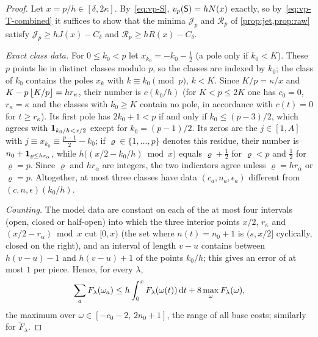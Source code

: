 \begin{proof}
Let $x=p/h\in[\delta,2\kappa]$. By~\eqref{eq:vp-S}, $v_p(\mathsf{S})=hN(x)$ exactly, so
by~\eqref{eq:vp-T-combined} it suffices to show that the minima $\mathcal J_p$ and $\mathcal R_p$
of \cref{prop:jet,prop:raw} satisfy $\mathcal J_p\ge hJ(x)-C_\delta$ and
$\mathcal R_p\ge hR(x)-C_\delta$.

\emph{Exact class data.} For $0\le k_0<p$ let $x_{k_0}=-k_0-\frac12$ (a pole only if $k_0<K$).
These $p$ points lie in distinct classes modulo $p$, so the classes are indexed by $k_0$; the class
of $k_0$ contains the poles $x_k$ with $k\equiv k_0\pmod p$, $k<K$. Since $K/p=\kappa/x$ and
$K-p\left\lfloor K/p\right\rfloor=hr_\kappa$, their number is $c(k_0/h)$ (for $K<p\le2K$ one has $c_0=0$,
$r_\kappa=\kappa$ and the classes with $k_0\ge K$ contain no pole, in accordance with
$c(t)=0$ for $t\ge r_\kappa$). Its first pole has
$2k_0+1<p$ if and only if $k_0\le(p-3)/2$, which agrees with $\mathbf{1}_{k_0/h<x/2}$ except for
$k_0=(p-1)/2$. Its zeros are the $j\in[1,A]$ with $j\equiv x_{k_0}\equiv\frac{p-1}2-k_0$; if
$\varrho\in\{1,\dots,p\}$ denotes this residue, their number is $n_0+\mathbf{1}_{\varrho\le hr_\alpha}$,
while $h\bigl((x/2-k_0/h)\bmod x\bigr)$ equals $\varrho+\frac12$ for $\varrho<p$ and $\frac12$ for
$\varrho=p$. Since $\varrho$ and $hr_\alpha$ are integers, the two indicators agree unless
$\varrho=hr_\alpha$ or $\varrho=p$. Altogether, at most three classes have data
$(c_a,n_a,\epsilon_a)$ different from $(c,n,\epsilon)(k_0/h)$.

\emph{Counting.} The model data are constant on each of the at most four intervals (open, closed or
half-open) into which the three interior points $x/2$, $r_\kappa$ and $(x/2-r_\alpha)\bmod x$ cut
$[0,x)$ (the set where $n(t)=n_0+1$ is $(s,x/2]$ cyclically, closed on the right), and an interval
of length $v-u$ contains between $h(v-u)-1$ and $h(v-u)+1$ of the points $k_0/h$; this gives an error of at most
$1$ per piece. Hence, for every $\lambda$,
\[
  \sum_aF_\lambda(\omega_a)\le h\int_0^xF_\lambda(\omega(t))\,\mathrm{d} t+8\max_\omega F_\lambda(\omega),
\]
the maximum over $\omega\in[-c_0-2,\,2n_0+1]$, the range of all base costs; similarly for
$\widetilde F_\lambda$.


\end{proof}
